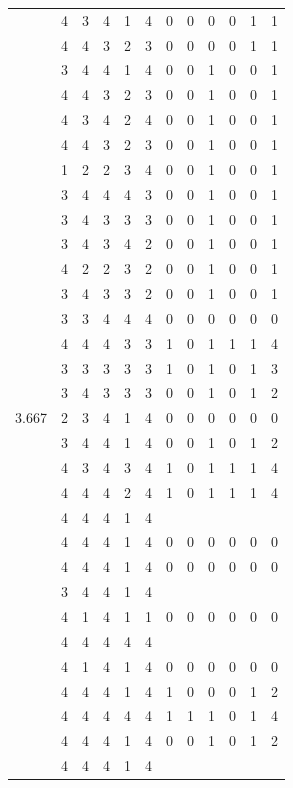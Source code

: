 \documentclass[]{book}
\theoremstyle{definition}
\theoremstyle{definition}
\theoremstyle{definition}
\theoremstyle{remark}
\begin{document}
\begin{table}
{\begin{tabular}[t]{rrrrrrrrrrrr}
 & 4 & 3 & 4 & 1 & 4 & 0 & 0 & 0 & 0 & 1 & 1\\
 & 4 & 4 & 3 & 2 & 3 & 0 & 0 & 0 & 0 & 1 & 1\\
 & 3 & 4 & 4 & 1 & 4 & 0 & 0 & 1 & 0 & 0 & 1\\
 & 4 & 4 & 3 & 2 & 3 & 0 & 0 & 1 & 0 & 0 & 1\\
 & 4 & 3 & 4 & 2 & 4 & 0 & 0 & 1 & 0 & 0 & 1\\
 & 4 & 4 & 3 & 2 & 3 & 0 & 0 & 1 & 0 & 0 & 1\\
 & 1 & 2 & 2 & 3 & 4 & 0 & 0 & 1 & 0 & 0 & 1\\
 & 3 & 4 & 4 & 4 & 3 & 0 & 0 & 1 & 0 & 0 & 1\\
 & 3 & 4 & 3 & 3 & 3 & 0 & 0 & 1 & 0 & 0 & 1\\
 & 3 & 4 & 3 & 4 & 2 & 0 & 0 & 1 & 0 & 0 & 1\\
 & 4 & 2 & 2 & 3 & 2 & 0 & 0 & 1 & 0 & 0 & 1\\
 & 3 & 4 & 3 & 3 & 2 & 0 & 0 & 1 & 0 & 0 & 1\\
 & 3 & 3 & 4 & 4 & 4 & 0 & 0 & 0 & 0 & 0 & 0\\
 & 4 & 4 & 4 & 3 & 3 & 1 & 0 & 1 & 1 & 1 & 4\\
 & 3 & 3 & 3 & 3 & 3 & 1 & 0 & 1 & 0 & 1 & 3\\
 & 3 & 4 & 3 & 3 & 3 & 0 & 0 & 1 & 0 & 1 & 2\\
3.667 & 2 & 3 & 4 & 1 & 4 & 0 & 0 & 0 & 0 & 0 & 0\\
 & 3 & 4 & 4 & 1 & 4 & 0 & 0 & 1 & 0 & 1 & 2\\
 & 4 & 3 & 4 & 3 & 4 & 1 & 0 & 1 & 1 & 1 & 4\\
 & 4 & 4 & 4 & 2 & 4 & 1 & 0 & 1 & 1 & 1 & 4\\
 & 4 & 4 & 4 & 1 & 4 &  &  &  &  &  & \\
 & 4 & 4 & 4 & 1 & 4 & 0 & 0 & 0 & 0 & 0 & 0\\
 & 4 & 4 & 4 & 1 & 4 & 0 & 0 & 0 & 0 & 0 & 0\\
 & 3 & 4 & 4 & 1 & 4 &  &  &  &  &  & \\
 & 4 & 1 & 4 & 1 & 1 & 0 & 0 & 0 & 0 & 0 & 0\\
 & 4 & 4 & 4 & 4 & 4 &  &  &  &  &  & \\
 & 4 & 1 & 4 & 1 & 4 & 0 & 0 & 0 & 0 & 0 & 0\\
 & 4 & 4 & 4 & 1 & 4 & 1 & 0 & 0 & 0 & 1 & 2\\
 & 4 & 4 & 4 & 4 & 4 & 1 & 1 & 1 & 0 & 1 & 4\\
 & 4 & 4 & 4 & 1 & 4 & 0 & 0 & 1 & 0 & 1 & 2\\
 & 4 & 4 & 4 & 1 & 4 &  &  &  &  &  & \\

\end{tabular}}
\end{table}
\end{document}
